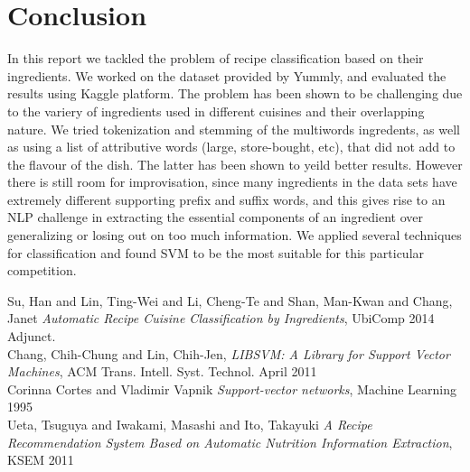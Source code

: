 \documentclass[prodmode,acmtap]{acmlarge}
\begin{document}
\section{Conclusion}
In this report we tackled the problem of recipe classification based on their ingredients. We worked on the dataset provided by Yummly, and evaluated the results using Kaggle platform. The problem has been shown to be challenging due to the variery of ingredients used in different cuisines and their overlapping nature. We tried tokenization and stemming of the multiwords ingredents, as well as using a list of attributive words (large, store-bought, etc), that did not add to the flavour of the dish. The latter has been shown to yeild better results. However there is still room for improvisation, since many ingredients in the data sets have extremely different supporting prefix and suffix words, and this gives rise to an NLP challenge in extracting the essential components of an ingredient over generalizing or losing out on too much information. We applied several techniques for classification and found SVM to be the most suitable for this particular competition.

\begin{thebibliography}{1}

   Su, Han and Lin, Ting-Wei and Li, Cheng-Te and Shan, Man-Kwan and Chang, Janet {\em Automatic Recipe Cuisine Classification by Ingredients},  UbiComp 2014 Adjunct.
\\
   Chang, Chih-Chung and Lin, Chih-Jen, {\em LIBSVM: A Library for Support Vector Machines}, ACM Trans. Intell. Syst. Technol. April 2011
\\

   Corinna Cortes and Vladimir Vapnik {\em Support-vector networks}, Machine Learning 1995
 \\

   Ueta, Tsuguya and Iwakami, Masashi and Ito, Takayuki {\em A Recipe Recommendation System Based on Automatic Nutrition Information Extraction}, KSEM 2011 


\end{thebibliography}
\end{document}
